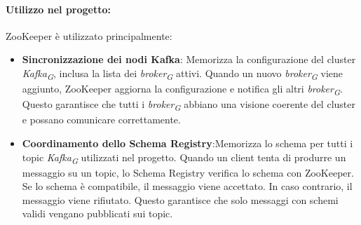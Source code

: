 \paragraph*{Utilizzo nel progetto:}
ZooKeeper è utilizzato principalmente:
\begin{itemize}
    \item \textbf{Sincronizzazione dei nodi Kafka}: Memorizza la configurazione del cluster \textit{Kafka}\textsubscript{\textit{G}}, inclusa la lista dei \textit{broker}\textsubscript{\textit{G}} attivi.
    Quando un nuovo \textit{broker}\textsubscript{\textit{G}} viene aggiunto, ZooKeeper aggiorna la configurazione e notifica gli altri \textit{broker}\textsubscript{\textit{G}}.
    Questo garantisce che tutti i \textit{broker}\textsubscript{\textit{G}} abbiano una visione coerente del cluster e possano comunicare correttamente.
    \item \textbf{Coordinamento dello Schema Registry}:Memorizza lo schema per tutti i topic \textit{Kafka}\textsubscript{\textit{G}} utilizzati nel progetto.
    Quando un client tenta di produrre un messaggio su un topic, lo Schema Registry verifica lo schema con ZooKeeper.
    Se lo schema è compatibile, il messaggio viene accettato. In caso contrario, il messaggio viene rifiutato.
    Questo garantisce che solo messaggi con schemi validi vengano pubblicati sui topic.
    
\end{itemize}
